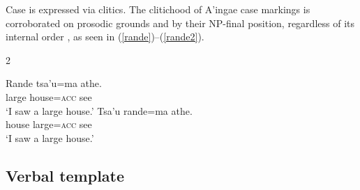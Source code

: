 \documentclass[output=paper,colorlinks,citecolor=brown]{langscibook}
\begin{document}
Case is expressed via clitics. The clitichood of A'ingae case markings is corroborated on prosodic grounds \citep[they stand outside of the phonological noun,][]{dabkowski2019morphophonology} and by their NP-final position, regardless of its internal order \citep{fischerhengeveld}, as seen in (\ref{rande})--(\ref{rande2}).
\begin{multicols}{2}
\begin{exe}
    \ex\label{rande}     \gll Rande tsa'u=ma athe. \\
         large house=\textsc{acc} see \\
    \glt `I saw a large house.'
    \ex\label{rande2}     \gll Tsa'u rande=ma athe. \\
         house large=\textsc{acc} see \\
    \glt `I saw a large house.'
\end{exe}
\end{multicols}




\subsection{Verbal template}
\label{sec:conjugation}


\newcommand{\clr}{\cellcolor{gray!15}}
\end{document}
